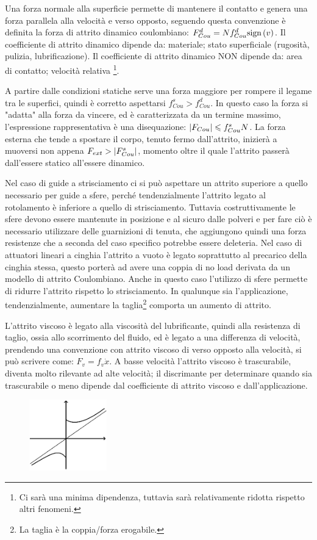 Una forza normale alla superficie permette di mantenere il contatto e genera una forza parallela alla velocità e verso opposto, seguendo questa convenzione è definita la forza di attrito dinamico coulombiano: $F_{Cou}^d = N f_{Cou}^d \textup{sign}\left(v\right)$.
Il coefficiente di attrito dinamico dipende da: materiale; stato superficiale (rugosità, pulizia, lubrificazione).
Il coefficiente di attrito dinamico NON dipende da: area di contatto; velocità relativa \footnote{Ci sarà una minima dipendenza, tuttavia sarà relativamente ridotta rispetto altri fenomeni.}.

A partire dalle condizioni statiche serve una forza maggiore per rompere il legame tra le superfici, quindi è corretto aspettarsi $f_{Cou}^s>f_{Cou}^d$. In questo caso la forza si "adatta" alla forza da vincere, ed è caratterizzata da un termine massimo, l'espressione rappresentativa è una disequazione: $\left|F_{Cou}\right| \leqslant f_{Cou}^s N$.
La forza esterna che tende a spostare il corpo, tenuto fermo dall'attrito, inizierà a muoversi non appena $F_{ext}>\left|F_{Cou}^s\right|$, momento oltre il quale l'attrito passerà dall'essere statico all'essere dinamico.

Nel caso di guide a strisciamento ci si può aspettare un attrito superiore a quello necessario per guide a sfere, perché tendenzialmente l'attrito legato al rotolamento è inferiore a quello di strisciamento.
Tuttavia costruttivamente le sfere devono essere mantenute in posizione e al sicuro dalle polveri e per fare ciò è necessario utilizzare delle guarnizioni di tenuta, che aggiungono quindi una forza resistenze che a seconda del caso specifico potrebbe essere deleteria.
Nel caso di attuatori lineari a cinghia l'attrito a vuoto è legato soprattutto al precarico della cinghia stessa, questo porterà ad avere una coppia di no load derivata da un modello di attrito Coulombiano. Anche in questo caso l'utilizzo di sfere permette di ridurre l'attrito rispetto lo strisciamento.
In qualunque sia l'applicazione, tendenzialmente, aumentare la taglia\footnote{La taglia è la coppia/forza erogabile.} comporta un aumento di attrito.

L'attrito viscoso è legato alla viscosità del lubrificante, quindi alla resistenza di taglio, ossia allo scorrimento del fluido, ed è legato a una differenza di velocità, prendendo una convenzione con attrito viscoso di verso opposto alla velocità, si può scrivere come: $F_v=f_v \dot{x}$.
A basse velocità l'attrito viscoso è trascurabile, diventa molto rilevante ad alte velocità; il discrimante per determinare quando sia trascurabile o meno dipende dal coefficiente di attrito viscoso e dall'applicazione.

\begin{figure}[h]
    \centering
    \includegraphics[width=0.3\textwidth]{Immagini/somma_effetti_attrito.png}
\end{figure}